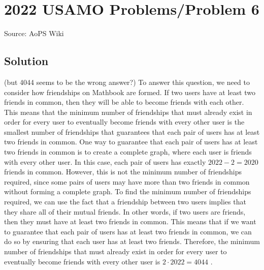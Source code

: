 \documentclass[12pt]{article}
\begin{document}
\section*{{2022 USAMO Problems/Problem 6}}
Source: AoPS Wiki

\subsection*{Solution}
(but 4044 seems to be the wrong answer?)
To answer this question, we need to consider how friendships on Mathbook are formed. If two users have at least two friends in common, then they will be able to become friends with each other. This means that the minimum number of friendships that must already exist in order for every user to eventually become friends with every other user is the smallest number of friendships that guarantees that each pair of users has at least two friends in common. One way to guarantee that each pair of users has at least two friends in common is to create a complete graph, where each user is friends with every other user. In this case, each pair of users has exactly $2022 - 2 = 2020$ friends in common. However, this is not the minimum number of friendships required, since some pairs of users may have more than two friends in common without forming a complete graph. To find the minimum number of friendships required, we can use the fact that a friendship between two users implies that they share all of their mutual friends. In other words, if two users are friends, then they must have at least two friends in common. This means that if we want to guarantee that each pair of users has at least two friends in common, we can do so by ensuring that each user has at least two friends. Therefore, the minimum number of friendships that must already exist in order for every user to eventually become friends with every other user is $2 \cdot 2022 = \boxed{4044}$ .
\end{document}
